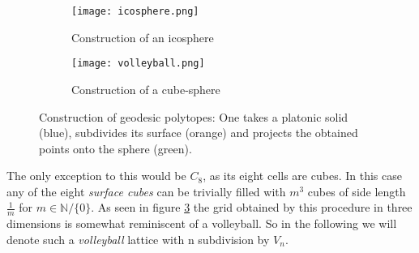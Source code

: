 \begin{figure}
 \centering
 \begin{subfigure}{0.9\textwidth}
  \texttt{[image: icosphere.png]}
  \caption{Construction of an icosphere}
  \label{fig:icospherePic}
 \end{subfigure}
 \begin{subfigure}{0.9\textwidth}
  \texttt{[image: volleyball.png]}
  \caption{Construction of a cube-sphere}
  \label{fig:volleyPic}
 \end{subfigure}
 \caption{Construction of geodesic polytopes: One takes a platonic solid (blue), subdivides its surface (orange) and projects the obtained points onto the sphere (green).}
\end{figure}

The only exception to this would be $C_8$, as its eight cells are cubes. In this case any of the eight \emph{surface cubes} can be trivially filled with $m^3$ cubes of side length $\frac{1}{m}$ for $m \in \mathbb{N}/\{0\}$. As seen in figure \ref{fig:volleyPic} the grid obtained by this procedure in three dimensions is somewhat reminiscent of a volleyball. So in the following we will denote such a \emph{volleyball} lattice with n subdivision by $V_n$. \\

